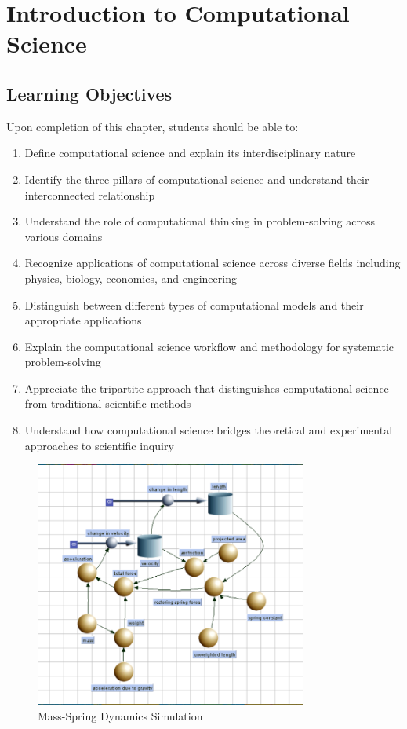 \chapter{Introduction to Computational Science}

\section{Learning Objectives}

Upon completion of this chapter, students should be able to:

\begin{enumerate}
  \item Define computational science and explain its interdisciplinary nature
  \item Identify the three pillars of computational science and understand their interconnected relationship
  \item Understand the role of computational thinking in problem-solving across various domains
  \item Recognize applications of computational science across diverse fields including physics, biology, economics, and engineering
  \item Distinguish between different types of computational models and their appropriate applications
  \item Explain the computational science workflow and methodology for systematic problem-solving
  \item Appreciate the tripartite approach that distinguishes computational science from traditional scientific methods
  \item Understand how computational science bridges theoretical and experimental approaches to scientific inquiry
\end{enumerate}

\begin{figure}[ht]
  \centering
  \includegraphics[width=0.8\textwidth]{images/chapter1_title_simulation.png}
  \caption{Mass-Spring Dynamics Simulation}
  \label{fig:chapter1_title}
\end{figure}

